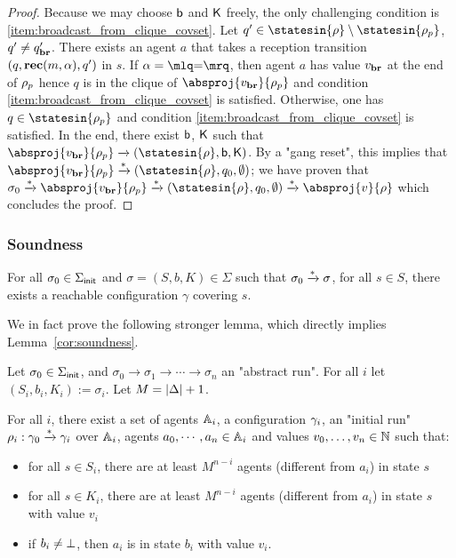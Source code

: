 \begin{proof}
	Because we may choose $\mathsf{b}$ and $\mathsf{K}$ freely, the only challenging condition is \ref{item:broadcast_from_clique_covset}.
	Let $q' \in \statesin{\run} \setminus \statesin{\run_p}$, $q' \ne q_{\textbf{br}}'$. 
	There exists an agent $a$ that takes a reception transition $(q,\textbf{rec}(m, \alpha),q')$ in $s$. 
	If $\anact = \quotemarks{\eqtestact}$, then agent $a$ has value $v_{\textbf{br}}$ at the end of $\rho_p$ hence $q$ is in the clique of $\absproj{\avalbr}{\run_p}$ and condition \ref{item:broadcast_from_clique_covset} is satisfied. Otherwise, one has $q \in \statesin{\run_p}$ and condition \ref{item:broadcast_from_clique_covset} is satisfied.
	In the end, there exist $\mathsf{b}$, $\mathsf{K}$ such that $\absproj{\avalbr}{\run_p} \step{} (\statesin{\run}, \boss,\clique)$. By a "gang reset", this implies that $\absproj{\avalbr}{\run_p} \step{*} (\statesin{\run}, q_0, \emptyset)$; we have proven that $\aconfiginit \step{*}\absproj{\avalbr}{\run_p} \step{*} (\statesin{\run}, q_0, \emptyset) \step{*} \absproj{\aval}{\run}$ which concludes the proof. 
\end{proof}


\subsubsection{Soundness}
\label{sec:one-soundness}

\begin{lemma}
	\label{cor:soundness}
	For all $\sigma_0 \in \Sigma_{\mathsf{init}}$ and $\sigma = (S, b, K) \in \Sigma$ such that $\sigma_0 \xrightarrow{*} \sigma$, for all $s \in S$, there exists a reachable configuration $\gamma$ covering $s$.
\end{lemma}


We in fact prove the following stronger lemma, which directly implies Lemma~\ref{cor:soundness}.

\begin{lemma}
	\label{lem:correctness-construction}
	
	
	Let $\sigma_0 \in \Sigma_{\mathsf{init}}$, and $\sigma_0 \to \sigma_1 \to \cdots \to \sigma_n$ an "abstract run". For all $i$ let $(S_i, b_i, K_i) := \sigma_i$. Let $M = |\Delta|+1$.
	
	For all $i$, there exist a set of agents $\mathbb{A}_i$, a configuration $\gamma_i$, an "initial run" $\rho_i : \gamma_0 \xrightarrow{*} \gamma_i$ over $\mathbb{A}_i$, agents $a_0, \cdots, a_n \in \mathbb{A}_i$ and values $v_0, \ldots, v_n \in \mathbb{N}$ such that:
	\begin{itemize}
		\item for all $s \in S_i$, there are at least $M^{n-i}$ agents (different from $a_i$) in state $s$ 
		
		\item for all $s \in K_i$, there are at least $M^{n-i}$ agents (different from $a_i$) in state $s$ with value $v_i$
		
		\item if $b_i \neq \bot$, then $a_i$ is in state $b_i$ with value $v_i$.
	\end{itemize}
\end{lemma}

